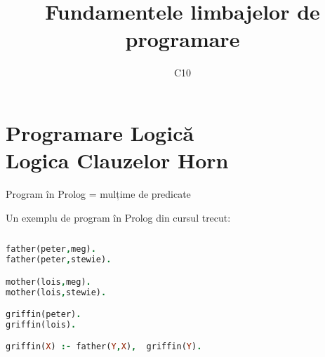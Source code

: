 \documentclass[xcolor=pdftex,romanian,colorlinks]{beamer}
\title[FLP]{Fundamentele limbajelor de programare}
\subtitle{C10}
\date{}
\begin{document}
\begin{frame}
  \titlepage
\end{frame}

\setlength{\leftmargini}{12pt}




\section{\color{section-color}Programare Logică \\ Logica Clauzelor Horn}  

\begin{frame}[fragile]{Program  în Prolog = mulțime de predicate}

Un exemplu de \alert{program în Prolog} din cursul trecut:
 
\begin{columns}
\begin{column}{.5\textwidth}
\vspace{-.2cm}
\begin{lstlisting}[language=Prolog]
father(peter,meg). 
father(peter,stewie).

mother(lois,meg). 
mother(lois,stewie).

griffin(peter).
griffin(lois).

griffin(X) :- father(Y,X),  griffin(Y).
\end{lstlisting}
\end{column}
\begin{column}{.3\textwidth}
\\
\\
\\
\end{column}
\end{columns}

\end{frame}



\end{document}
